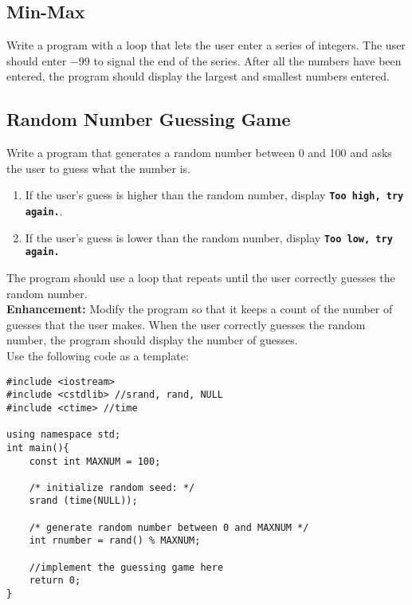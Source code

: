 \documentclass{article}
\begin{document}
\subsection{Min-Max}
Write a program with a loop that lets the user enter a series of integers. The user should
enter −99 to signal the end of the series. After all the numbers have been entered, the
program should display the largest and smallest numbers entered.

\subsection{Random Number Guessing Game}
Write a program that generates a random number between 0 and 100 and asks the user to guess what the number is. 
\begin{enumerate}
\item If the user's guess is higher than the random number, display \texttt{\textbf{Too high, try again.}}. 
\item If the user's guess is lower than the random number, display \texttt{\textbf{Too low, try again.}} 
\end{enumerate}
The program should use a loop that repeats until the user correctly guesses the random number. \\
\textbf{Enhancement: }Modify the program so that it keeps a count of the number of guesses that the user makes. When the user correctly guesses the random number, the program should display the number of guesses.\\
Use the following code as a template:

\begin{verbatim}
#include <iostream>
#include <cstdlib> //srand, rand, NULL
#include <ctime> //time

using namespace std;
int main(){
	const int MAXNUM = 100;

	/* initialize random seed: */
	srand (time(NULL));

	/* generate random number between 0 and MAXNUM */
	int rnumber = rand() % MAXNUM;

	//implement the guessing game here
	return 0;
}
\end{verbatim}
\end{document}
